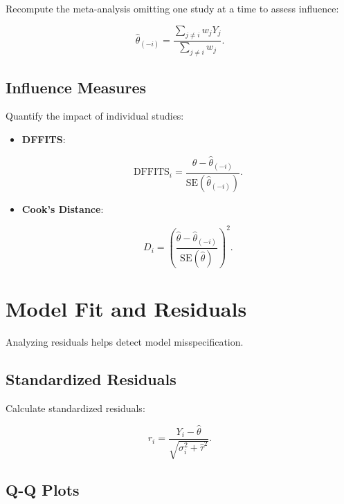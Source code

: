 \documentclass[12pt,a4paper]{report}
\begin{document}
Recompute the meta-analysis omitting one study at a time to assess influence:

\begin{equation}
\label{eq:leave_one_out}
\hat{\theta}_{(-i)} = \frac{\sum_{j \ne i} w_j Y_j}{\sum_{j \ne i} w_j}.
\end{equation}

\subsection{Influence Measures}
\label{subsec:influence_measures}

Quantify the impact of individual studies:

\begin{itemize}
    \item \textbf{DFFITS}:

    \begin{equation}
    \label{eq:dffits}
    \text{DFFITS}_i = \frac{\hat{\theta} - \hat{\theta}_{(-i)}}{\text{SE}(\hat{\theta}_{(-i)})}.
    \end{equation}

    \item \textbf{Cook's Distance}:

    \begin{equation}
    \label{eq:cooks_distance}
    D_i = \left( \frac{\hat{\theta} - \hat{\theta}_{(-i)}}{\text{SE}(\hat{\theta})} \right)^2.
    \end{equation}
\end{itemize}

\section{Model Fit and Residuals}
\label{sec:model_fit_residuals}

Analyzing residuals helps detect model misspecification.

\subsection{Standardized Residuals}
\label{subsec:standardized_residuals}

Calculate standardized residuals:

\begin{equation}
\label{eq:standardized_residuals}
r_i = \frac{Y_i - \hat{\theta}}{\sqrt{\sigma_i^2 + \hat{\tau}^2}}.
\end{equation}

\subsection{Q-Q Plots}
\label{subsec:qq_plots}
\end{document}
